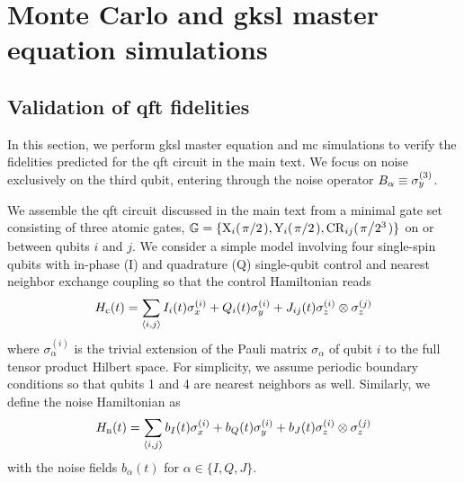 \chapter{Monte Carlo and \texorpdfstring{\acrshort{gksl}}{GKSL} master equation simulations}\label{ch:app:ff:time_domain_methods}
\section{Validation of \texorpdfstring{\acrshort{qft}}{QFT} fidelities}\label{sec:app:ff:time_domain_methods:qft_validation}
In this section, we perform \gls{gksl} master equation and \gls{mc} simulations to verify the fidelities predicted for the \gls{qft} circuit in the main text.
We focus on noise exclusively on the third qubit, entering through the noise operator $B_\alpha\equiv\sigma_y^{(3)}$.

We assemble the \gls{qft} circuit discussed in the main text from a minimal gate set consisting of three atomic gates, $\mathbb{G} = \lbrace\mr{X}_{i}(\flatfrac{\pi}{2}),\mr{Y}_{i}(\flatfrac{\pi}{2}),\mr{CR}_{ij}(\flatfrac{\pi}{2^3})\rbrace$ on or between qubits $i$ and $j$.
We consider a simple model involving four single-spin qubits with in-phase (I) and quadrature (Q) single-qubit control and nearest neighbor exchange coupling so that the control Hamiltonian reads
\begin{equation}\label{eq:app:ff:control_hamiltonian:qft}
    H_{\mathrm{c}}(t) = \sum_{\langle i,j\rangle} I_i(t)\sigma_x^{(i)} + Q_i(t)\sigma_y^{(i)} + J_{ij}(t)\sigma_z^{(i)}\otimes\sigma_z^{(j)}
\end{equation}
where $\sigma_\alpha^{(i)}$ is the trivial extension of the Pauli matrix $\sigma_\alpha$ of qubit $i$ to the full tensor product Hilbert space.
For simplicity, we assume periodic boundary conditions so that qubits 1 and 4 are nearest neighbors as well.
Similarly, we define the noise Hamiltonian as
\begin{equation}\label{eq:app:ff:noise_hamiltonian:qft}
    H_{\mathrm{n}}(t) = \sum_{\langle i,j\rangle} b_{I}(t)\sigma_x^{(i)} + b_{Q}(t)\sigma_y^{(i)} + b_{J}(t)\sigma_z^{(i)}\otimes\sigma_z^{(j)}
\end{equation}
with the noise fields $b_{\alpha}(t)$ for $\alpha\in\{I,Q,J\}$.

